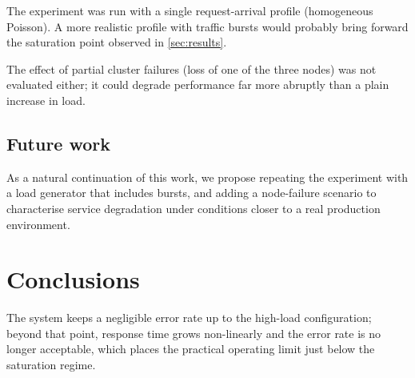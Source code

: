 \documentclass[11pt,twoside]{article}
\begin{document}
The experiment was run with a single request-arrival profile (homogeneous
Poisson). A more realistic profile with traffic bursts would probably
bring forward the saturation point observed in \autoref{sec:results}.

The effect of partial cluster failures (loss of one of the three nodes)
was not evaluated either; it could degrade performance far more abruptly
than a plain increase in load.

\subsection{Future work}

As a natural continuation of this work, we propose repeating the
experiment with a load generator that includes bursts, and adding a
node-failure scenario to characterise service degradation under
conditions closer to a real production environment.

\section{Conclusions}
\label{sec:conclusions}

The system keeps a negligible error rate up to the high-load
configuration; beyond that point, response time grows non-linearly and
the error rate is no longer acceptable, which places the practical
operating limit just below the saturation regime.
\end{document}

